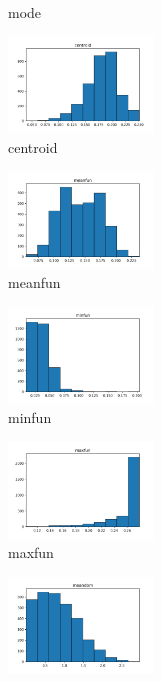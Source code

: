 \documentclass[a4paper]{article}
\begin{document}
\begin{figure}
\begin{subfigure}{0.32\textwidth}
        \caption{mode}
        \label{fig:sub_raw_10}
    \end{subfigure}\hfill
    \begin{subfigure}{0.32\textwidth}
        \centering
        \includegraphics[width=3.85cm]{raw_10_centroid}
        \caption{centroid}
        \label{fig:sub_raw_11}
    \end{subfigure}\hfill
    \begin{subfigure}{0.32\textwidth}
        \centering
        \includegraphics[width=3.85cm]{raw_11_meanfun}
        \caption{meanfun}
        \label{fig:sub_raw_12}
    \end{subfigure}\hfill
    \begin{subfigure}{0.32\textwidth}
        \centering
        \includegraphics[width=3.85cm]{raw_12_minfun}
        \caption{minfun}
        \label{fig:sub_raw_13}
    \end{subfigure}\hfill
    \begin{subfigure}{0.32\textwidth}
        \centering
        \includegraphics[width=3.85cm]{raw_13_maxfun}
        \caption{maxfun}
        \label{fig:sub_raw_14}
    \end{subfigure}\hfill
    \begin{subfigure}{0.32\textwidth}
        \centering
        \includegraphics[width=3.85cm]{raw_14_meandom}

\end{subfigure}
\end{figure}
\end{document}
